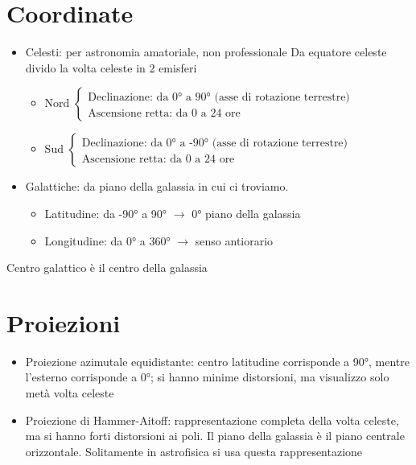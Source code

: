 \section*{Coordinate}
\begin{itemize}
    \item Celesti: per astronomia amatoriale, non professionale
    Da equatore celeste divido la volta celeste in 2 emisferi
    \begin{itemize}
        \item Nord 
        $\begin{cases}
            \text{Declinazione: da 0° a 90° (asse di rotazione terrestre)} \\
            \text{Ascensione retta: da 0 a 24 ore} 
        \end{cases}$
        \item Sud
        $\begin{cases}
            \text{Declinazione: da 0° a -90° (asse di rotazione terrestre)} \\
            \text{Ascensione retta: da 0 a 24 ore}
        \end{cases}$
    \end{itemize}
    \item Galattiche: da piano della galassia in cui ci troviamo. 
    \begin{itemize}
        \item Latitudine: da -90° a 90° $\rightarrow$ 0° piano della galassia
        \item Longitudine: da 0° a 360° $\rightarrow$ senso antiorario
    \end{itemize}
\end{itemize}
Centro galattico è il centro della galassia

\section*{Proiezioni}
\begin{itemize}
    \item Proiezione azimutale equidistante: centro latitudine corrisponde a 90°, mentre l'esterno corrisponde a 0°; si hanno minime distorsioni, ma visualizzo solo metà volta celeste
    \item Proiezione di Hammer-Aitoff: rappresentazione completa della volta celeste, ma si hanno forti distorsioni ai poli. Il piano della galassia è il piano centrale orizzontale. Solitamente in astrofisica si usa questa rappresentazione
\end{itemize}

